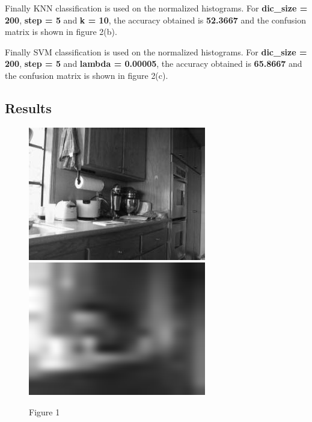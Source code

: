 \documentclass[letter, 11pt]{article}
\begin{document}
Finally KNN classification is used on the normalized histograms. For \textbf{dic\_size = 200}, \textbf{step = 5} and \textbf{k = 10}, the accuracy obtained is \textbf{52.3667} and the confusion matrix is shown in figure 2(b).

Finally SVM classification is used on the normalized histograms. For \textbf{dic\_size = 200}, \textbf{step = 5} and \textbf{lambda = 0.00005}, the accuracy obtained is \textbf{65.8667} and the confusion matrix is shown in figure 2(c).

\subsection*{Results}
\begin{figure}[H]
        \centering
        \includegraphics[width=\textwidth]{HW3/RESULT/original.png}
    \endminipage\hfill
        \centering
        \includegraphics[width=\textwidth]{HW3/RESULT/tiny.png}
    \endminipage\hfill
    \caption*{Figure 1}
\end{figure}
\end{document}
